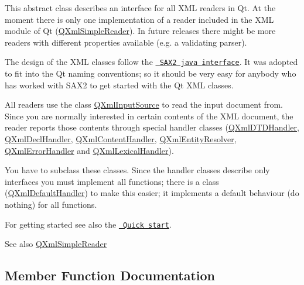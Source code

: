 This abstract class describes an interface for all X\+ML readers in Qt. At the moment there is only one implementation of a reader included in the X\+ML module of Qt (\mbox{\hyperlink{class_q_xml_simple_reader}{Q\+Xml\+Simple\+Reader}}). In future releases there might be more readers with different properties available (e.\+g. a validating parser).

The design of the X\+ML classes follow the \href{http://www.megginson.com/SAX/}{\texttt{ S\+A\+X2 java interface}}. It was adopted to fit into the Qt naming conventions; so it should be very easy for anybody who has worked with S\+A\+X2 to get started with the Qt X\+ML classes.

All readers use the class \mbox{\hyperlink{class_q_xml_input_source}{Q\+Xml\+Input\+Source}} to read the input document from. Since you are normally interested in certain contents of the X\+ML document, the reader reports those contents through special handler classes (\mbox{\hyperlink{class_q_xml_d_t_d_handler}{Q\+Xml\+D\+T\+D\+Handler}}, \mbox{\hyperlink{class_q_xml_decl_handler}{Q\+Xml\+Decl\+Handler}}, \mbox{\hyperlink{class_q_xml_content_handler}{Q\+Xml\+Content\+Handler}}, \mbox{\hyperlink{class_q_xml_entity_resolver}{Q\+Xml\+Entity\+Resolver}}, \mbox{\hyperlink{class_q_xml_error_handler}{Q\+Xml\+Error\+Handler}} and \mbox{\hyperlink{class_q_xml_lexical_handler}{Q\+Xml\+Lexical\+Handler}}).

You have to subclass these classes. Since the handler classes describe only interfaces you must implement all functions; there is a class (\mbox{\hyperlink{class_q_xml_default_handler}{Q\+Xml\+Default\+Handler}}) to make this easier; it implements a default behaviour (do nothing) for all functions.

For getting started see also the \href{xml-sax.html\#quickStart}{\texttt{ Quick start}}.

\begin{DoxySeeAlso}{See also}
\mbox{\hyperlink{class_q_xml_simple_reader}{Q\+Xml\+Simple\+Reader}} 
\end{DoxySeeAlso}


\subsection{Member Function Documentation}
\mbox{\label{class_q_xml_reader_ae86bc7841c2dbf289b300a1b00f93187}} 
